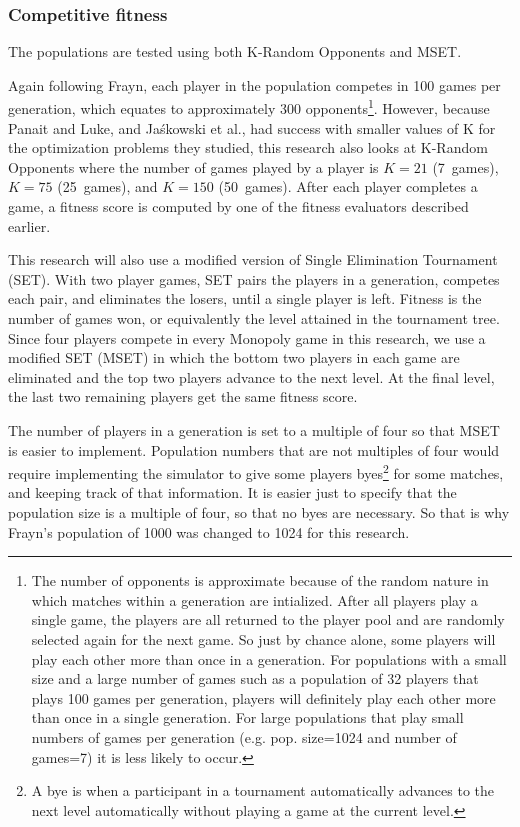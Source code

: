 \subsubsection{Competitive fitness} \label{5_compfit}

The populations are tested using both K-Random Opponents and MSET.

Again following Frayn, each player in the population competes in 100 games per
generation, which equates to approximately 300 opponents\footnote{The number of
opponents is approximate because of the random nature in which matches within a
generation are intialized. After all players play a single game, the players are
all returned to the player pool and are randomly selected again for the next
game. So just by chance alone, some players will play each other more than once
in a generation. For populations with a small size and a large number of games
such as a population of 32 players that plays 100 games per generation, players
will definitely play each other more than once in a single generation. For large
populations that play small numbers of games per generation (e.g. pop. size=1024
and number of games=7) it is less likely to occur.}. However, because Panait
and Luke, and Ja\'{s}kowski et al., had success with smaller values of K for the
optimization problems they studied, this research also looks at K-Random
Opponents where the number of games played by a player is \(K=21\) (7~games),
\(K=75\) (25~games), and \(K=150\) (50~games). After each player completes a
game, a fitness score is computed by one of the fitness evaluators described
earlier.

This research will also use a modified version of Single Elimination Tournament
(SET). With two player games, SET pairs the players in a generation, competes
each pair, and eliminates the losers, until a single player is left.
Fitness is the number of games won, or equivalently the level attained in the
tournament tree. Since four players compete in every Monopoly game in this
research, we use a modified SET (MSET) in which the bottom two players in each
game are eliminated and the top two players advance to the next level. At the
final level, the last two remaining players get the same fitness score.

The number of players in a generation is set to a multiple of four so that
MSET is easier to implement. Population numbers that are not multiples of
four would require implementing the simulator to give some players
byes\footnote{A bye is when a participant in a tournament automatically
advances to the next level automatically without playing a game at the current
level.} for some matches, and keeping track of that information. It is easier
just to specify that the population size is a multiple of four, so that no byes
are necessary. So that is why Frayn's population of 1000 was changed to 1024 for
this research.


